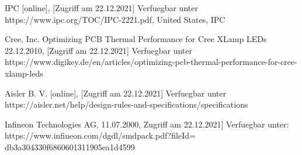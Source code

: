 \documentclass[10pt,a4paper,oneside,abstracton]{scrartcl}
\begin{document}
\begin{multicols}{2}
\begin{thebibliography}{9}
IPC  [online], [Zugriff am 22.12.2021] Verfuegbar unter https://www.ipc.org/TOC/IPC-2221.pdf, United States, IPC

Cree, Inc. Optimizing PCB Thermal Performance for Cree XLamp LEDs 22.12.2010, [Zugriff am 22.12.2021] Verfuegbar unter https://www.digikey.de/en/articles/optimizing-pcb-thermal-performance-for-cree-xlamp-leds

Aisler B. V.  [online], [Zugriff am 22.12.2021] Verfuegbar unter https://aisler.net/help/design-rules-and-specifications/specifications

Infineon Technologies AG, 11.07.2000, Zugriff am 22.12.2021] Verfuegbar unter: https://www.infineon.com/dgdl/smdpack.pdf?fileId=
db3a304330f6860601311905ea1d4599


\end{thebibliography}

\end{multicols}
 
\end{document}
